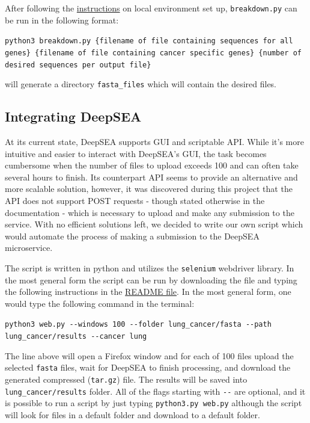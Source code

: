 \documentclass{article}
\begin{document}
After following the \href{https://github.com/sme777/seaWAS/blob/master/README.md}{instructions} on local environment set up, \texttt{breakdown.py} can be run in the following format: 
\begin{center}
\texttt{python3 breakdown.py \{filename of file containing sequences for all genes\} \{filename of file containing cancer specific genes\} \{number of desired sequences per output file\}}
\end{center}
will generate a directory \texttt{fasta\_files} which will contain the desired files.

\subsection{Integrating DeepSEA}
At its current state, DeepSEA supports GUI and scriptable API. While it’s more intuitive and easier to interact with DeepSEA’s GUI, the task becomes cumbersome when the number of files to upload exceeds 100 and can often take several hours to finish. Its counterpart API seems to provide an alternative and more scalable solution, however, it was discovered during this project that the API does not support POST requests - though stated otherwise in the documentation - which is necessary to upload and make any submission to the service. With no efficient solutions left, we decided to write our own script which would automate the process of making a submission to the DeepSEA microservice.

The script is written in python and utilizes the \texttt{selenium} webdriver library. In the most general form the script can be run by downloading the file and typing the following instructions in the \href{https://github.com/sme777/seaWAS/blob/master/README.md}{README file}. In the most general form, one would type the following command in the terminal:
\begin{center}
\texttt{python3 web.py -{}-windows 100 -{}-folder lung\_cancer/fasta -{}-path lung\_cancer/results -{}-cancer lung}
\end{center}
The line above will open a Firefox window and for each of 100 files upload the selected \texttt{fasta} files, wait for DeepSEA to finish processing, and download the generated compressed (\texttt{tar.gz}) file. The results will be saved into \texttt{lung\_cancer/results} folder. All of the flags starting with \texttt{-{}-} are optional, and it is possible to run a script by just typing \texttt{python3.py web.py} although the script will look for files in a default folder and download to a default folder.
\end{document}
